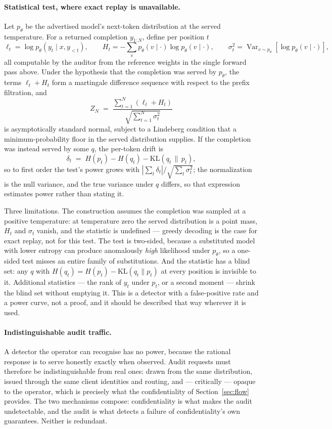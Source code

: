 \documentclass[11pt]{article}
\begin{document}
\paragraph{Statistical test, where exact replay is unavailable.}
Let $p_\theta$ be the advertised model's next-token distribution at the served temperature. For a
returned completion $y_{1:N}$, define per position $t$
\[
\ell_t = \log p_\theta(y_t \mid x, y_{<t}), \qquad
H_t = -\sum_v p_\theta(v \mid \cdot) \log p_\theta(v \mid \cdot), \qquad
\sigma_t^2 = \operatorname{Var}_{v \sim p_\theta}\!\left[\log p_\theta(v \mid \cdot)\right],
\]
all computable by the auditor from the reference weights in the single forward pass above. Under the
hypothesis that the completion was served by $p_\theta$, the terms $\ell_t + H_t$ form a
martingale difference sequence with respect to the prefix filtration, and
\[
Z_N \;=\; \frac{\sum_{t=1}^{N} (\ell_t + H_t)}{\sqrt{\sum_{t=1}^{N} \sigma_t^2}}
\]
is asymptotically standard normal, subject to a Lindeberg condition that a minimum-probability floor
in the served distribution supplies. If the completion was instead served by some $q$, the per-token
drift is
\[
\delta_t \;=\; H(p_t) - H(q_t) - \mathrm{KL}(q_t \,\|\, p_t),
\]
so to first order the test's power grows with $\left|\sum_t \delta_t\right| / \sqrt{\sum_t
\sigma_t^2}$; the normalization is the null variance, and the true variance under $q$ differs, so
that expression estimates power rather than stating it.

Three limitations. The construction assumes the completion was sampled at a positive temperature:
at temperature zero the served distribution is a point mass, $H_t$ and $\sigma_t$ vanish, and the
statistic is undefined --- greedy decoding is the case for exact replay, not for this test. The test
is two-sided, because a substituted model with lower entropy can produce anomalously \emph{high}
likelihood under $p_\theta$, so a one-sided test misses an entire family of substitutions. And the
statistic has a blind set: any $q$ with $H(q_t) = H(p_t) - \mathrm{KL}(q_t\|p_t)$ at every position
is invisible to it. Additional statistics --- the rank of $y_t$ under $p_t$, or a second moment ---
shrink the blind set without emptying it. This is a detector with a false-positive rate and a power
curve, not a proof, and it should be described that way wherever it is used.

\paragraph{Indistinguishable audit traffic.}
A detector the operator can recognise has no power, because the rational response is to serve
honestly exactly when observed. Audit requests must therefore be indistinguishable from real ones:
drawn from the same distribution, issued through the same client identities and routing, and
--- critically --- opaque to the operator, which is precisely what the confidentiality of
Section~\ref{sec:flow} provides. The two mechanisms compose: confidentiality is what makes the audit
undetectable, and the audit is what detects a failure of confidentiality's own guarantees. Neither
is redundant.
\end{document}
